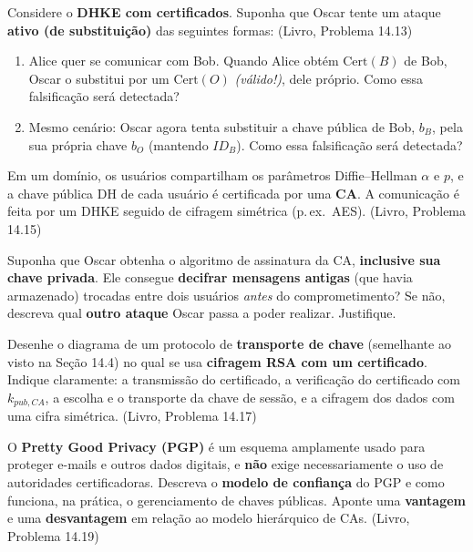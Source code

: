 \documentclass[11pt,a4paper]{article}
\newcommand{\livro}[1]{{\footnotesize\color{black!50}(Livro, Problema #1)}}
\begin{document}
\begin{exercicio}
Considere o \textbf{DHKE com certificados}. Suponha que Oscar tente um ataque \textbf{ativo (de substitui\c{c}\~{a}o)} das seguintes formas: \livro{14.13}
\begin{enumerate}[label=(\alph*)]
    \item Alice quer se comunicar com Bob. Quando Alice obt\'{e}m $\text{Cert}(B)$ de Bob, Oscar o substitui por um $\text{Cert}(O)$ \emph{(v\'{a}lido!)}, dele pr\'{o}prio. Como essa falsifica\c{c}\~{a}o ser\'{a} detectada?
    \item Mesmo cen\'{a}rio: Oscar agora tenta substituir a chave p\'{u}blica de Bob, $b_B$, pela sua pr\'{o}pria chave $b_O$ (mantendo $ID_B$). Como essa falsifica\c{c}\~{a}o ser\'{a} detectada?
\end{enumerate}
\end{exercicio}

\begin{exercicio}
Em um dom\'{i}nio, os usu\'{a}rios compartilham os par\^{a}metros Diffie--Hellman $\alpha$ e $p$, e a chave p\'{u}blica DH de cada usu\'{a}rio \'{e} certificada por uma \textbf{CA}. A comunica\c{c}\~{a}o \'{e} feita por um DHKE seguido de cifragem sim\'{e}trica (p.\,ex.\ AES). \livro{14.15}

Suponha que Oscar obtenha o algoritmo de assinatura da CA, \textbf{inclusive sua chave privada}. Ele consegue \textbf{decifrar mensagens antigas} (que havia armazenado) trocadas entre dois usu\'{a}rios \emph{antes} do comprometimento? Se n\~{a}o, descreva qual \textbf{outro ataque} Oscar passa a poder realizar. Justifique.
\end{exercicio}

\begin{exercicio}
Desenhe o diagrama de um protocolo de \textbf{transporte de chave} (semelhante ao visto na Se\c{c}\~{a}o 14.4) no qual se usa \textbf{cifragem RSA com um certificado}. Indique claramente: a transmiss\~{a}o do certificado, a verifica\c{c}\~{a}o do certificado com $k_{pub,CA}$, a escolha e o transporte da chave de sess\~{a}o, e a cifragem dos dados com uma cifra sim\'{e}trica. \livro{14.17}
\end{exercicio}

\begin{exercicio}
O \textbf{Pretty Good Privacy (PGP)} \'{e} um esquema amplamente usado para proteger e-mails e outros dados digitais, e \textbf{n\~{a}o} exige necessariamente o uso de autoridades certificadoras. Descreva o \textbf{modelo de confian\c{c}a} do PGP e como funciona, na pr\'{a}tica, o gerenciamento de chaves p\'{u}blicas. Aponte uma \textbf{vantagem} e uma \textbf{desvantagem} em rela\c{c}\~{a}o ao modelo hier\'{a}rquico de CAs. \livro{14.19}
\end{exercicio}
\end{document}
